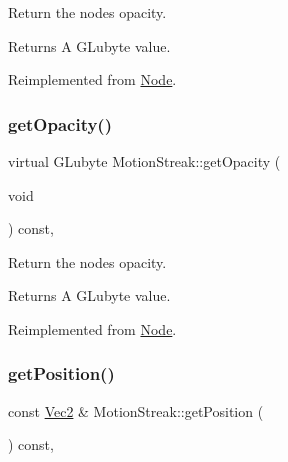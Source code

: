 Return the node\textquotesingle{}s opacity. \begin{DoxyReturn}{Returns}
A G\+Lubyte value. 
\end{DoxyReturn}


Reimplemented from \hyperlink{classNode_ab999cce3763ea09e74014245c770ea97}{Node}.

\mbox{\label{classMotionStreak_a7e7bfd8eb37092a0477b2c1012e179c2}} 
\subsubsection{\texorpdfstring{get\+Opacity()}{getOpacity()}\hspace{0.1cm}{\footnotesize\ttfamily [2/2]}}
{\footnotesize\ttfamily virtual G\+Lubyte Motion\+Streak\+::get\+Opacity (\begin{DoxyParamCaption}\item[{void}]{ }\end{DoxyParamCaption}) const\hspace{0.3cm}{\ttfamily [override]}, {\ttfamily [virtual]}}

Return the node\textquotesingle{}s opacity. \begin{DoxyReturn}{Returns}
A G\+Lubyte value. 
\end{DoxyReturn}


Reimplemented from \hyperlink{classNode_ab999cce3763ea09e74014245c770ea97}{Node}.

\mbox{\label{classMotionStreak_ae5dbfd01e4931044ac764dd43c6fbf30}} 
\subsubsection{\texorpdfstring{get\+Position()}{getPosition()}\hspace{0.1cm}{\footnotesize\ttfamily [1/4]}}
{\footnotesize\ttfamily const \hyperlink{classVec2}{Vec2} \& Motion\+Streak\+::get\+Position (\begin{DoxyParamCaption}{ }\end{DoxyParamCaption}) const\hspace{0.3cm}{\ttfamily [override]}, {\ttfamily [virtual]}}




